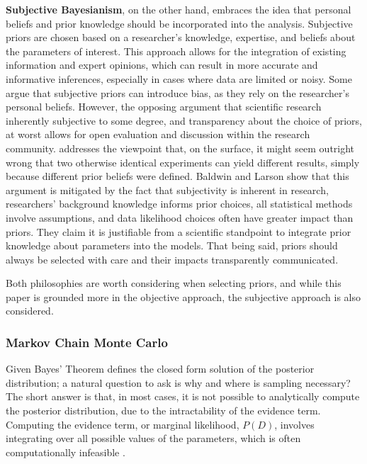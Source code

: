 \textbf{Subjective Bayesianism}, on the other hand, embraces the idea that
personal beliefs and prior knowledge should be incorporated into the analysis.
Subjective priors are chosen based on a researcher's knowledge, expertise, and
beliefs about the parameters of interest. This approach allows for the
integration of existing information and expert opinions, which can result in
more accurate and informative inferences, especially in cases where data are
limited or noisy. Some argue that subjective priors can introduce bias, as they
rely on the researcher's personal beliefs. However, the opposing argument that
scientific research inherently subjective to some degree, and transparency
about the choice of priors, at worst allows for open evaluation and discussion
within the research community.
\cite{clinical} addresses the viewpoint that, on the surface, it might seem
outright wrong that two otherwise identical experiments can yield different
results, simply because different prior beliefs were defined. Baldwin and
Larson show that this argument is mitigated by the fact that subjectivity is
inherent in research, researchers' background knowledge informs prior choices,
all statistical methods involve assumptions, and data likelihood choices often
have greater impact than priors. They claim it is justifiable from a scientific
standpoint to integrate prior knowledge about parameters into the models. That
being said, priors should always be selected with care and their impacts
transparently communicated. 

Both philosophies are worth considering when selecting priors, and while this
paper is grounded more in the objective approach, the subjective approach is
also considered.

\subsubsection{Markov Chain Monte Carlo}

Given Bayes' Theorem defines the closed form solution of the posterior
distribution; a natural question to ask is why and where is sampling necessary?
The short answer is that, in most cases, it is not possible to analytically
compute the posterior distribution, due to the intractability of the evidence
term. Computing the evidence term, or marginal likelihood, $P(D)$,
involves integrating over all possible values of the parameters, which is often
computationally infeasible \cite{mcmc}.

